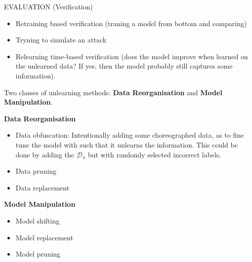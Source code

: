 EVALUATION (Verification)
\begin{itemize}
    \item Retraining based verification (traning a model from bottom and comparing)
    \item Tryning to simulate an attack
    \item Relearning time-based verification (does the model improve when learned on the unlearned data? If yes, then the model probably still captures some information).
\end{itemize}



Two classes of unlearning methods: \textbf{Data Reorganisation} and \textbf{Model Manipulation}.

\textbf{Data Reorganisation}
\begin{itemize}
    \item Data obfuscation: Intentionally adding some choreographed data, as to fine tune the model with such that it unlearns the information. This could be done by adding the $\mathcal{D}_u$ but with randomly selected incorrect labels.
    \item Data pruning
    \item Data replacement
\end{itemize}

\textbf{Model Manipulation}
\begin{itemize}
    \item Model shifting
    \item Model replacement 
    \item Model pruning
\end{itemize}



